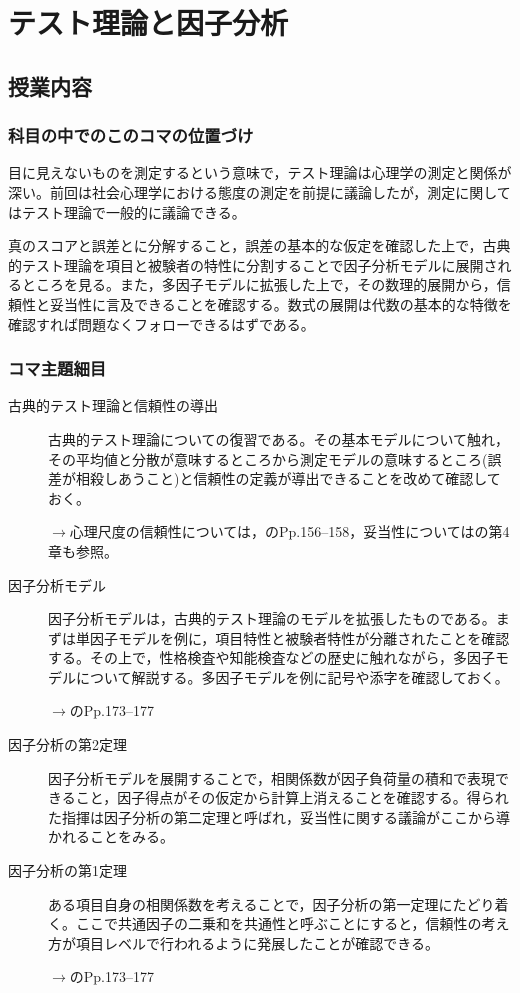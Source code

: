 \section{テスト理論と因子分析}
\subsection{授業内容}
\subsubsection{科目の中でのこのコマの位置づけ}
目に見えないものを測定するという意味で，テスト理論は心理学の測定と関係が深い。前回は社会心理学における態度の測定を前提に議論したが，測定に関してはテスト理論で一般的に議論できる。

真のスコアと誤差とに分解すること，誤差の基本的な仮定を確認した上で，古典的テスト理論を項目と被験者の特性に分割することで因子分析モデルに展開されるところを見る。また，多因子モデルに拡張した上で，その数理的展開から，信頼性と妥当性に言及できることを確認する。数式の展開は代数の基本的な特徴を確認すれば問題なくフォローできるはずである。

\subsubsection{コマ主題細目}
\begin{description}
	\item[古典的テスト理論と信頼性の導出]古典的テスト理論についての復習である。その基本モデルについて触れ，その平均値と分散が意味するところから測定モデルの意味するところ(誤差が相殺しあうこと)と信頼性の定義が導出できることを改めて確認しておく。

	\begin{flushright}
		$\to$心理尺度の信頼性については，\textcite{Suenaga1987}のPp.156--158，妥当性については\textcite{kosugi2016b}の第4章も参照。
	\end{flushright}


	\item[因子分析モデル]因子分析モデルは，古典的テスト理論のモデルを拡張したものである。まずは単因子モデルを例に，項目特性と被験者特性が分離されたことを確認する。その上で，性格検査や知能検査などの歴史に触れながら，多因子モデルについて解説する。多因子モデルを例に記号や添字を確認しておく。
	      \begin{flushright}
		      $\to$\textcite{kosugi2018}のPp.173--177
	      \end{flushright}

	\item[因子分析の第2定理]因子分析モデルを展開することで，相関係数が因子負荷量の積和で表現できること，因子得点がその仮定から計算上消えることを確認する。得られた指揮は因子分析の第二定理と呼ばれ，妥当性に関する議論がここから導かれることをみる。

	\item[因子分析の第1定理]ある項目自身の相関係数を考えることで，因子分析の第一定理にたどり着く。ここで共通因子の二乗和を共通性と呼ぶことにすると，信頼性の考え方が項目レベルで行われるように発展したことが確認できる。
	      \begin{flushright}
		      $\to$\textcite{kosugi2018}のPp.173--177
	      \end{flushright}
\end{description}

